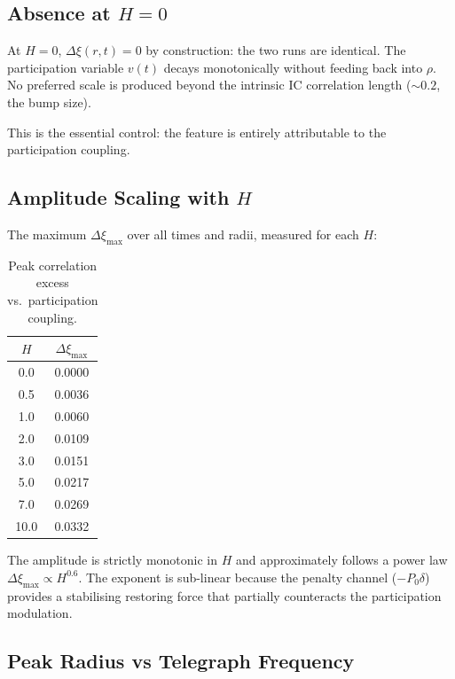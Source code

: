 \documentclass[11pt]{article}
\begin{document}
\subsection{Absence at \texorpdfstring{\(H = 0\)}{H = 0}}

At \(H = 0\), \(\Delta\xi(r, t) = 0\) by construction: the two runs are identical. The participation variable \(v(t)\) decays monotonically without feeding back into \(\rho\). No preferred scale is produced beyond the intrinsic IC correlation length (\(\sim 0.2\), the bump size).

This is the essential control: the feature is entirely attributable to the participation coupling.

\subsection{Amplitude Scaling with \texorpdfstring{\(H\)}{H}}

The maximum \(\Delta\xi_{\max}\) over all times and radii, measured for each \(H\):

\begin{table}[h]
\centering
\begin{tabular}{@{}cc@{}}
\toprule
\(H\) & \(\Delta\xi_{\max}\) \\
\midrule
0.0  & 0.0000 \\
0.5  & 0.0036 \\
1.0  & 0.0060 \\
2.0  & 0.0109 \\
3.0  & 0.0151 \\
5.0  & 0.0217 \\
7.0  & 0.0269 \\
10.0 & 0.0332 \\
\bottomrule
\end{tabular}
\caption{Peak correlation excess vs.\ participation coupling.}
\label{tab:amplitude}
\end{table}

The amplitude is strictly monotonic in \(H\) and approximately follows a power law \(\Delta\xi_{\max} \propto H^{0.6}\). The exponent is sub-linear because the penalty channel (\(-P_0 \delta\)) provides a stabilising restoring force that partially counteracts the participation modulation.

\subsection{Peak Radius vs Telegraph Frequency}
\end{document}

